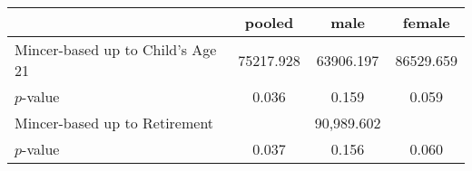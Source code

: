 \begin{tabular}{lccc} \toprule
 & pooled  & male  & female  \\  \hline 
Mincer-based up to Child's Age 21 & 75217.928 & 63906.197 & 86529.659 \\  
$p$-value &     0.036 &     0.159 &     0.059 \\  
Mincer-based up to Retirement&   & 90,989.602 &   \\  
$p$-value &     0.037 &     0.156 &     0.060 \\  
\hline \hline \end{tabular}
